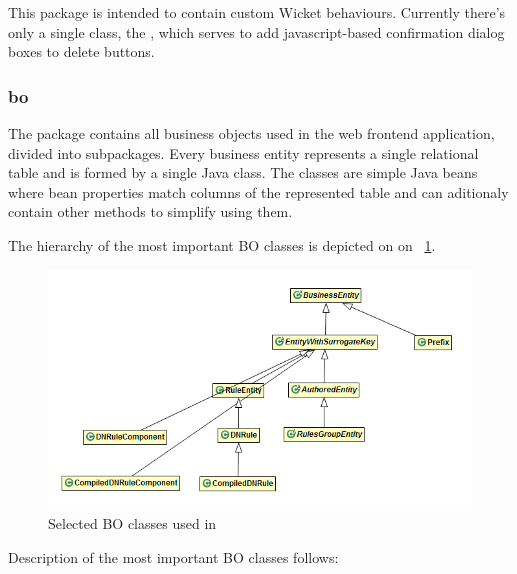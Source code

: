 This package is intended to contain custom Wicket behaviours. Currently there's only a single class, the , which serves to add javascript-based confirmation dialog boxes to delete buttons.

\subsubsection{bo}

The  package contains all business objects used in the web frontend application, divided into subpackages. Every business entity represents a single relational table and is formed by a single Java class. The classes are simple Java beans where bean properties match columns of the represented table and can aditionaly contain other methods to simplify using them.

The hierarchy of the most important BO classes is depicted on on \figurename~\ref{fig:feBO}.

\begin{figure}[htb]
    \centering
    \includegraphics[width=1.05\textwidth]{images/dia-fe-bo.png}
    \caption{Selected BO classes used in \FE}
	\label{fig:feBO}
\end{figure}

Description of the most important BO classes follows:

